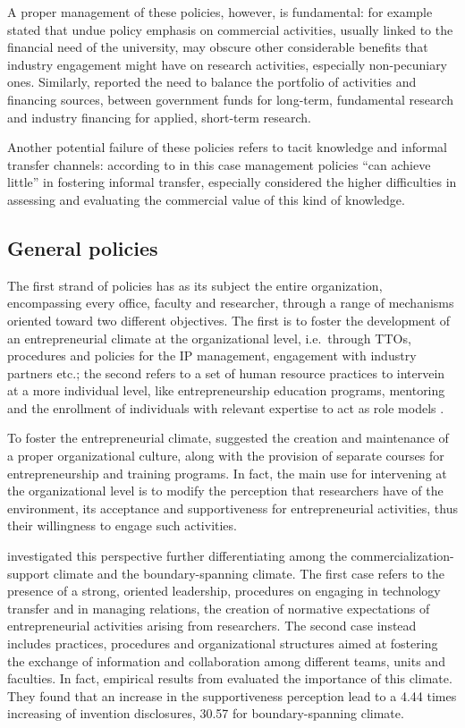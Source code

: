 A proper management of these policies, however, is fundamental: \citet{DEste2011} for example stated that undue policy emphasis on commercial activities, usually linked to the financial need of the university, may obscure other considerable benefits that industry engagement might have on research activities, especially non-pecuniary ones. Similarly, \citet{Debackere2005} reported the need to balance the portfolio of activities and financing sources, between government funds for long-term, fundamental research and industry financing for applied, short-term research. 

Another potential failure of these policies refers to tacit knowledge and informal transfer channels: according to \citet{Muscio2010} in this case management policies \enquote{can achieve little} in fostering informal transfer, especially considered the higher difficulties in assessing and evaluating the commercial value of this kind of knowledge. 

\subsection{General policies}

The first strand of policies has as its subject the entire organization, encompassing every office, faculty and researcher, through a range of mechanisms oriented toward two different objectives. The first is to foster the development of an entrepreneurial climate at the organizational level, i.e.\ through TTOs, procedures and policies for the IP management, engagement with industry partners etc.; the second refers to a set of human resource practices to intervein at a more individual level, like entrepreneurship education programs, mentoring and the enrollment of individuals with relevant expertise to act as role models \citep{Guerrero2014}. 

To foster the entrepreneurial climate, \citet{Klofsten2000} suggested the creation and maintenance of a proper organizational culture, along with the provision of separate courses for entrepreneurship and training programs. In fact, the main use for intervening at the organizational level is to modify the perception that researchers have of the environment, its acceptance and supportiveness for entrepreneurial activities, thus their willingness to engage such activities.

\citet{Hunter2011} investigated this perspective further differentiating among the commercialization-support climate and the boundary-spanning climate. The first case refers to the presence of a strong, oriented leadership, procedures on engaging in technology transfer and in managing relations, the creation of normative expectations of entrepreneurial activities arising from researchers. The second case instead includes practices, procedures and organizational structures aimed at fostering the exchange of information and collaboration among different teams, units and faculties. In fact, empirical results from \citet{Hunter2011} evaluated the importance of this climate. They found that an increase in the supportiveness perception lead to a 4.44 times increasing of invention disclosures, 30.57 for boundary-spanning climate. 

